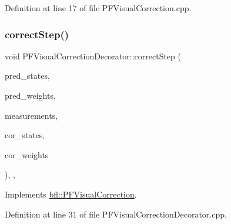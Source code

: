 Definition at line 17 of file P\+F\+Visual\+Correction.\+cpp.

\mbox{\label{classbfl_1_1PFVisualCorrectionDecorator_a0e02eb41e938fc083c18bff3ddf9b6d3}} 
\subsubsection{\texorpdfstring{correct\+Step()}{correctStep()}}
{\footnotesize\ttfamily void P\+F\+Visual\+Correction\+Decorator\+::correct\+Step (\begin{DoxyParamCaption}\item[{const Eigen\+::\+Ref$<$ const Eigen\+::\+Matrix\+Xf $>$ \&}]{pred\+\_\+states,  }\item[{const Eigen\+::\+Ref$<$ const Eigen\+::\+Vector\+Xf $>$ \&}]{pred\+\_\+weights,  }\item[{cv\+::\+Input\+Array}]{measurements,  }\item[{Eigen\+::\+Ref$<$ Eigen\+::\+Matrix\+Xf $>$}]{cor\+\_\+states,  }\item[{Eigen\+::\+Ref$<$ Eigen\+::\+Vector\+Xf $>$}]{cor\+\_\+weights }\end{DoxyParamCaption})\hspace{0.3cm}{\ttfamily [override]}, {\ttfamily [protected]}, {\ttfamily [virtual]}}



Implements \mbox{\hyperlink{classbfl_1_1PFVisualCorrection_a44a0ad575d02b89d5571b15ce585cf8f}{bfl\+::\+P\+F\+Visual\+Correction}}.



Definition at line 31 of file P\+F\+Visual\+Correction\+Decorator.\+cpp.

\mbox{\label{classbfl_1_1PFVisualCorrectionDecorator_abf6fcd12be618e8eda474b4c9638760e}} 
